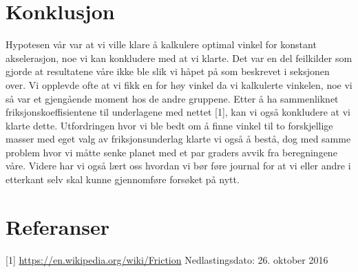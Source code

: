 \documentclass[10pt,a4paper]{report}
\begin{document}
{\let\clearpage\relax\chapter*{Konklusjon}}
Hypotesen vår var at vi ville klare å kalkulere optimal vinkel for konstant akselerasjon, noe vi kan konkludere med at vi klarte. Det var en del feilkilder som gjorde at resultatene våre ikke ble slik vi håpet på som beskrevet i seksjonen over. Vi opplevde ofte at vi fikk en for høy vinkel da vi kalkulerte vinkelen, noe vi så var et gjengående moment hos de andre gruppene. Etter å ha sammenliknet friksjonskoeffisientene til underlagene med nettet [1], kan vi også konkludere at vi klarte dette. Utfordringen hvor vi ble bedt om å finne vinkel til to forskjellige masser med eget valg av friksjonsunderlag klarte vi også å bestå, dog med samme problem hvor vi måtte senke planet med et par graders avvik fra beregningene våre. Videre har vi også lært oss hvordan vi bør føre journal for at vi eller andre i etterkant selv skal kunne gjennomføre forsøket på nytt.

\chapter*{Referanser}
[1] \href{url}{https://en.wikipedia.org/wiki/Friction}
Nedlastingsdato: 26. oktober 2016
\end{document}
